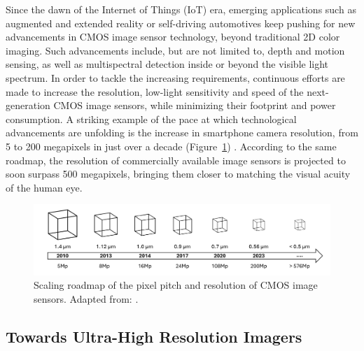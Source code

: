 Since the dawn of the Internet of Things (IoT) era, emerging applications such as augmented and extended reality or self-driving automotives keep pushing for new advancements in CMOS image sensor technology, beyond traditional 2D color imaging. Such advancements include, but are not limited to, depth and motion sensing, as well as multispectral detection inside or beyond the visible light spectrum. In order to tackle the increasing requirements, continuous efforts are made to increase the resolution, low-light sensitivity and speed of the next-generation CMOS image sensors, while minimizing their footprint and power consumption. A striking example of the pace at which technological advancements are unfolding is the increase in smartphone camera resolution, from 5 to 200 megapixels in just over a decade (Figure~\ref{fig:ch1:pixel_size}) \cite{SookyoungRoh2025Dispersion-engineeredSensors}. According to the same roadmap, the resolution of commercially available image sensors is projected to soon surpass 500 megapixels, bringing them closer to matching the visual acuity of the human eye.


\begin{figure} [htbp]
  \centering
  \medskip
  \includegraphics[width=.99\textwidth]{chapters/introduction/image/pixel_miniaturization.pdf}
  \caption [Pixel miniaturization roadmap.]{Scaling roadmap of the pixel pitch and resolution of CMOS image sensors. Adapted from: \cite{SookyoungRoh2025Dispersion-engineeredSensors}.}
  \label{fig:ch1:pixel_size}
\end{figure}

\subsection{Towards Ultra-High Resolution Imagers}

